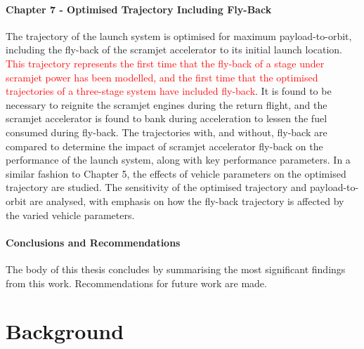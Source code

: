  
      
      \subsubsection*{Chapter 7 - Optimised Trajectory Including Fly-Back}
      
      The trajectory of the launch system is optimised for maximum payload-to-orbit, including the fly-back of the scramjet accelerator to its initial launch location. \textcolor{red}{This trajectory represents the first time that the fly-back of a stage under scramjet power has been modelled, and the first time that the optimised trajectories of a three-stage system have included fly-back}. 
      It is found to be necessary to reignite the scramjet engines during the return flight, and the scramjet accelerator is found to bank during acceleration to lessen the fuel consumed during fly-back.
      The trajectories with, and without, fly-back are compared to determine the impact of scramjet accelerator fly-back on the performance of the launch system, along with key performance parameters. 
      In a similar fashion to Chapter 5, the effects of vehicle parameters on the optimised trajectory are studied. The sensitivity of the optimised trajectory and payload-to-orbit are analysed, with emphasis on how the fly-back trajectory is affected by the varied vehicle parameters.
      
     
      

    \subsubsection*{Conclusions and Recommendations}

      The body of this thesis concludes by summarising the most significant findings from this work. Recommendations for future work are made. 
      
      
      
      \chapter{Background}
    
    
    
    
    
    
  
    
   
